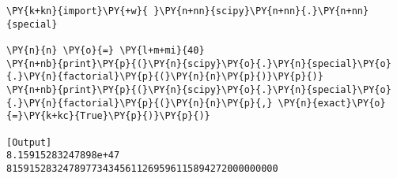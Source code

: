 \begin{Verbatim}[label=\makebox{\href{https://github.com/unipi-physics-labs/lab1-notes/tree/main/snippy/scipy.special.factorial.py}{https://github.com/.../scipy.special.factorial.py}},commandchars=\\\{\}]
\PY{k+kn}{import}\PY{+w}{ }\PY{n+nn}{scipy}\PY{n+nn}{.}\PY{n+nn}{special}

\PY{n}{n} \PY{o}{=} \PY{l+m+mi}{40}
\PY{n+nb}{print}\PY{p}{(}\PY{n}{scipy}\PY{o}{.}\PY{n}{special}\PY{o}{.}\PY{n}{factorial}\PY{p}{(}\PY{n}{n}\PY{p}{)}\PY{p}{)}
\PY{n+nb}{print}\PY{p}{(}\PY{n}{scipy}\PY{o}{.}\PY{n}{special}\PY{o}{.}\PY{n}{factorial}\PY{p}{(}\PY{n}{n}\PY{p}{,} \PY{n}{exact}\PY{o}{=}\PY{k+kc}{True}\PY{p}{)}\PY{p}{)}

[Output]
8.15915283247898e+47
815915283247897734345611269596115894272000000000
\end{Verbatim}
